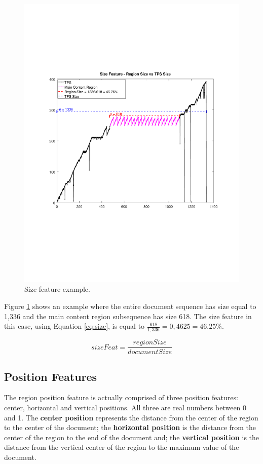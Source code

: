 \begin{figure}[h]
  \centering
     \includegraphics[trim={2.5cm 7.4cm 2.2cm 7.4cm}, clip,  width=\columnwidth]{img/size.pdf}
  \caption{Size feature example.}
  \label{fig:size}
\end{figure}

Figure \ref{fig:size} shows an example where the entire document sequence has
size equal to 1,336 and the main content region subsequence has size 618. The
size feature in this case, using Equation \ref{eq:size}, is equal to
$\frac{618}{1,336} = 0,4625 = 46.25\%$.

\begin{equation}\label{eq:size}
    sizeFeat = \frac{regionSize}{documentSize}
\end{equation}

\subsection{Position Features}\label{ss:pos}
The region position feature is actually comprised of three position features:
center, horizontal and vertical positions. All three are real numbers between 0
and 1. The \textbf{center position} represents the distance from the center of
the region to the center of the document; the \textbf{horizontal position} is
the distance from the center of the region to the end of the document and; the
\textbf{vertical position} is the distance from the vertical center of the
region to the maximum value of the document.

